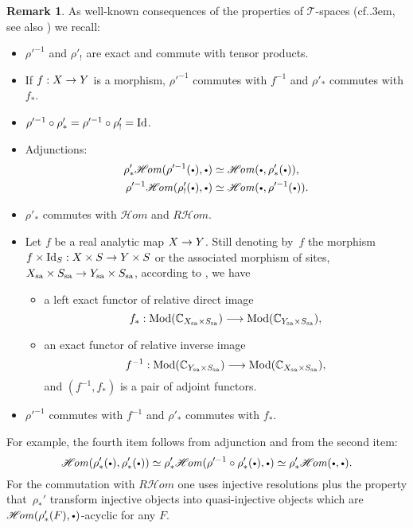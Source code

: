 \documentclass[english]{smfart}
\numberwithin{subsection}{section}
\def\sht{\mathcal{T}}
\newcommand{\Rhom}{R\shhom}
\newcommand{\shhom}{\mathcal{H}\!\mathit{om}}\let\ho\shhom
\newcommand{\Mod}{\mathrm{Mod}}
\newcommand{\sa}{\mathrm{sa}}
\newcommand{\XS}{X\times S}
\def\cf{cf.\kern.3em}
\newcommand{\cbbullet}{{\raisebox{1pt}{$\sbullet$}}}
\newcommand{\sbullet}{{\scriptscriptstyle\bullet}}
\numberwithin{equation}{section}
\theoremstyle{plain}
\theoremstyle{definition}
\newtheorem{remark}[equation]{Remark}
\def\to{\mathchoice{\longrightarrow}{\rightarrow}{\rightarrow}{\rightarrow}}
\begin{document}
\begin{remark}
\label{R}
As well-known consequences of the properties of $\sht$-spaces (\cf\cite[Ch.\,6,\,\S6.4,\,Prop.\,6.6.3]{K-S01}, see also \cite{Prelli08}) we recall:
\begin{itemize}
\item
$\rho'^{-1}$ and $\rho'_!$ are exact and commute with tensor products.
\item
If $f:X\to Y$ is a morphism, $\rho'^{-1}$ commutes with $f^{-1}$ and $\rho'_*$ commutes with $f_*$.
\item
$\rho'^{-1} \circ \rho'_* = \rho'^{-1}\circ \rho'_!=\operatorname{Id}$.
\item
Adjunctions:
\begin{align*}
\rho'_*\shhom(\rho^{\prime -1}(\cbbullet),\cbbullet) &\simeq \shhom(\cbbullet,\rho'_*(\cbbullet)),\\
\rho'^{-1}\shhom(\rho'_!(\cbbullet),\cbbullet)&\simeq \shhom(\cbbullet,\rho'^{-1}(\cbbullet)).
\end{align*}
\item
$\rho'_*$ commutes with $\shhom$ and $\Rhom$.
\item
Let $f$ be a real analytic map $X\to Y$. Still denoting by~$f$ the morphism $f\times \Id_S: \XS\to Y\times S$ or the associated morphism of sites, $X_{\sa}\times S_{\sa}\to Y_{\sa}\times S_{\sa}$,
according to \cite[17.5]{K-Sch06}, we have
\begin{itemize}
\item
a left exact functor of relative direct image
\[
f_*:\Mod(\CC_{X_{\sa}\times S_{\sa}})\to \Mod(\CC_{Y_{\sa}\times S_{\sa}}),
\]

\item
an exact functor of relative inverse image
\[
f^{-1}: \Mod(\CC_{Y_{\sa}\times S_{\sa}})\to \Mod(\CC_{X_{\sa}\times S_{\sa}}),
\]
and $(f^{-1},f_*)$ is a pair of adjoint functors.
\end{itemize}
\item
$\rho'^{-1}$ commutes with $f^{-1}$ and $\rho'_*$ commutes with $f_*$.
\end{itemize}

For example, the fourth item follows from adjunction and from the second item:
\[
\shhom(\rho'_*(\cbbullet),\rho'_*(\cbbullet)) \simeq \rho'_*\shhom(\rho'^{-1} \circ \rho'_*(\cbbullet),\cbbullet)\simeq
\rho'_*\shhom(\cbbullet,\cbbullet).
\]
For the commutation with $\Rhom$ one uses injective resolutions plus the property that~$\rho_*'$ transform injective objects into quasi-injective objects which are $\shhom(\rho'_*(F),\cbbullet)$-acyclic for any $F$.
\end{remark}
\end{document}
